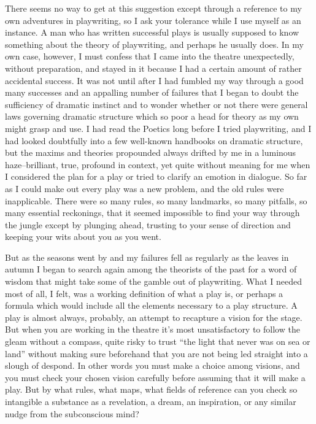 \documentclass[9pt,twoside]{extarticle}
\begin{document}
There seems no way to get at this suggestion except through a reference to my own adventures in playwriting, so I ask your tolerance while I use myself as an instance. A man who has written successful plays is usually supposed to know something about the theory of playwriting, and perhaps he usually does. In my own case, however, I must confess that I came into the theatre unexpectedly, without preparation, and stayed in it because I had a certain amount of rather accidental success. It was not until after I had fumbled my way through a good many successes and an appalling number of failures that I began to doubt the sufficiency of dramatic instinct and to wonder whether or not there were general laws governing dramatic structure which so poor a head for theory as my own might grasp and use. I had read the Poetics long before I tried playwriting, and I had looked doubtfully into a few well-known handbooks on dramatic structure, but the maxims and theories propounded always drifted by me in a luminous haze--brilliant, true, profound in context, yet quite without meaning for me when I considered the plan for a play or tried to clarify an emotion in dialogue. So far as I could make out every play was a new problem, and the old rules were inapplicable. There were so many rules, so many landmarks, so many pitfalls, so many essential reckonings, that it seemed impossible to find your way through the jungle except by plunging ahead, trusting to your sense of direction and keeping your wits about you as you went.

But as the seasons went by and my failures fell as regularly as the leaves in autumn I began to search again among the theorists of the past for a word of wisdom that might take some of the gamble out of playwriting. What I needed most of all, I felt, was a working definition of what a play is, or perhaps a formula which would include all the elements necessary to a play structure. A play is almost always, probably, an attempt to recapture a vision for the stage. But when you are working in the theatre it's most unsatisfactory to follow the gleam without a compass, quite risky to trust ``the light that never was on sea or land'' without making sure beforehand that you are not being led straight into a slough of despond. In other words you must make a choice among visions, and you must check your chosen vision carefully before assuming that it will make a play. But by what rules, what maps, what fields of reference can you check so intangible a substance as a revelation, a dream, an inspiration, or any similar nudge from the subconscious mind?
\end{document}
